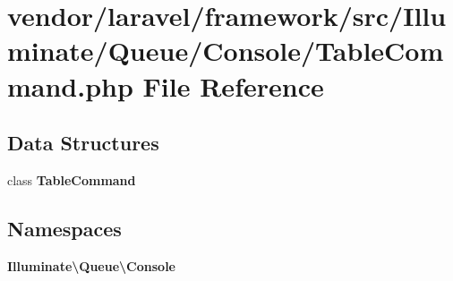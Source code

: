 \section{vendor/laravel/framework/src/\+Illuminate/\+Queue/\+Console/\+Table\+Command.php File Reference}
\label{_table_command_8php}
\subsection*{Data Structures}
\begin{DoxyCompactItemize}
\item 
class {\bf Table\+Command}
\end{DoxyCompactItemize}
\subsection*{Namespaces}
\begin{DoxyCompactItemize}
\item 
 {\bf Illuminate\textbackslash{}\+Queue\textbackslash{}\+Console}
\end{DoxyCompactItemize}
